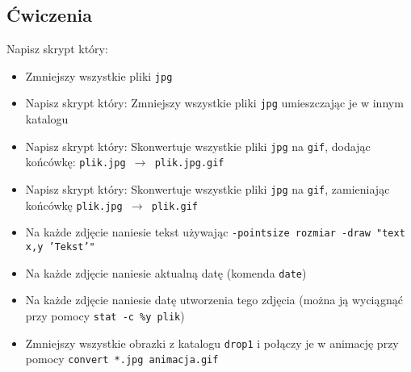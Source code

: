 \documentclass[polish]{instrukcja}
\begin{document}
\subsection*{Ćwiczenia}
Napisz skrypt który:
\begin{itemize}

\item Zmniejszy wszystkie pliki {\tt jpg}
\item Napisz skrypt który: Zmniejszy wszystkie pliki {\tt jpg} umieszczając je w innym katalogu
\item Napisz skrypt który: Skonwertuje wszystkie pliki {\tt jpg} na {\tt gif}, dodając końcówkę: {\tt plik.jpg $\rightarrow$ plik.jpg.gif}
\item Napisz skrypt który: Skonwertuje wszystkie pliki {\tt jpg} na {\tt gif}, zamieniając końcówkę {\tt plik.jpg $\rightarrow$ plik.gif}
\item Na każde zdjęcie naniesie tekst używając {\tt -pointsize {\green rozmiar} -draw "{}text {\green x},{\green y} '{\green Tekst}'"{}}
\item Na każde zdjęcie naniesie aktualną datę (komenda {\tt date})
\item Na każde zdjęcie naniesie datę utworzenia tego zdjęcia (można ją wyciągnąć przy pomocy {\tt stat -c \%y plik})
\item Zmniejszy wszystkie obrazki z katalogu {\tt drop1} i połączy je w animację przy pomocy {\tt convert *.jpg animacja.gif}
\end{itemize}
\end{document}
